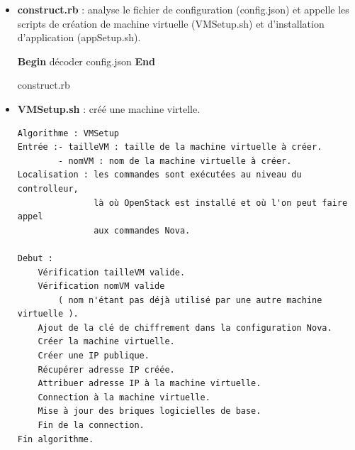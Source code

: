 \documentclass{report}
\begin{document}
   \begin{itemize}
            
        \item %
        \textbf{construct.rb} : analyse le fichier de configuration (config.json) et appelle les scripts de création de machine virtuelle (VMSetup.sh) et d'installation d'application (appSetup.sh).\newline
        \begin{algorithm}[H]
            \SetAlgoLined
            \textbf{Begin}\newline
            décoder config.json\;
             \textbf{End}
            \caption{construct.rb}
        \end{algorithm}
        \bigbreak
    
        \item %
        \textbf{VMSetup.sh} : créé une machine virtelle.\newline
        \begin{Verbatim}[frame=single,fontsize=\normalsize,commandchars=\\\{\},label=Algorithme VMSetup]
Algorithme : VMSetup
Entrée :- tailleVM : taille de la machine virtuelle à créer. 
        - nomVM : nom de la machine virtuelle à créer.
Localisation : les commandes sont exécutées au niveau du controlleur, 
               là où OpenStack est installé et où l'on peut faire appel
               aux commandes Nova.

Debut :
    Vérification tailleVM valide.
    Vérification nomVM valide 
        ( nom n'étant pas déjà utilisé par une autre machine virtuelle ).
    Ajout de la clé de chiffrement dans la configuration Nova.
    Créer la machine virtuelle.
    Créer une IP publique.
    Récupérer adresse IP créée.
    Attribuer adresse IP à la machine virtuelle.
    Connection à la machine virtuelle.
    Mise à jour des briques logicielles de base.
    Fin de la connection.
Fin algorithme.
        \end{Verbatim}
    \bigbreak
    
        \begin{algorithm}[H]
          \SetAlgoLined
         

\end{algorithm}
\end{itemize}
\end{document}
